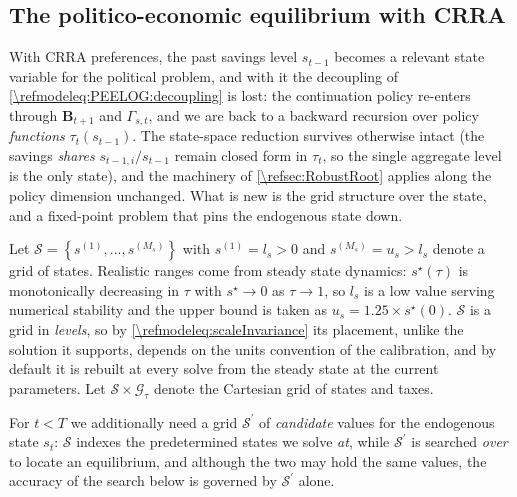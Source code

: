 \subsection{The politico-economic equilibrium with CRRA}\label{\refsec:PEE}
With CRRA preferences, the past savings level $s_{t-1}$ becomes a relevant state variable for the political problem, and with it the decoupling of \eqref{\refmodeleq:PEELOG:decoupling} is lost: the continuation policy re-enters through $\bm{B}_{t+1}$ and $\Gamma_{s,t}$, and we are back to a backward recursion over policy \emph{functions} $\tau_t(s_{t-1})$. The state-space reduction survives otherwise intact (the savings \emph{shares} $s_{t-1,i}/s_{t-1}$ remain closed form in $\tau_t$, so the single aggregate level is the only state), and the machinery of \cref{\refsec:RobustRoot} applies along the policy dimension unchanged. What is new is the grid structure over the state, and a fixed-point problem that pins the endogenous state down.

 Let $\mathcal{S} = \left\lbrace s^{(1)}, ..., s^{(M_s)} \right\rbrace$ with $s^{(1)} = l_s>0$ and $s^{(M_s)} = u_s>l_s$ denote a grid of states. Realistic ranges come from steady state dynamics: $s^{\star}(\tau)$ is monotonically decreasing in $\tau$ with $s^{\star} \rightarrow 0$ as $\tau \rightarrow 1$, so $l_s$ is a low value serving numerical stability and the upper bound is taken as $u_s = 1.25 \times s^{\star}(0)$. $\mathcal{S}$ is a grid in \emph{levels}, so by \eqref{\refmodeleq:scaleInvariance} its placement, unlike the solution it supports, depends on the units convention of the calibration, and by default it is rebuilt at every solve from the steady state at the current parameters. Let $\mathcal{S}\times\mathcal{G}_{\tau}$ denote the Cartesian grid of states and taxes.

For $t<T$ we additionally need a grid $\mathcal{S}^{\prime}$ of \emph{candidate} values for the endogenous state $s_t$: $\mathcal{S}$ indexes the predetermined states we solve \emph{at}, while $\mathcal{S}^{\prime}$ is searched \emph{over} to locate an equilibrium, and although the two may hold the same values, the accuracy of the search below is governed by $\mathcal{S}^{\prime}$ alone.

